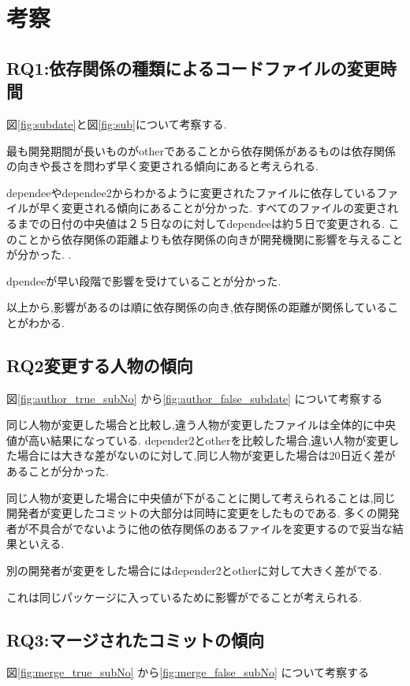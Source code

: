 \documentclass[submit,ses,noauthor]{ipsj} %
\begin{document}
\section{考察}\label{考察}

\subsection{RQ1:依存関係の種類によるコードファイルの変更時間}
図\ref{fig:subdate}と図\ref{fig:sub}について考察する.

最も開発期間が長いものがotherであることから依存関係があるものは依存関係の向きや長さを問わず早く変更される傾向にあると考えられる.


dependeeやdependee2からわかるように変更されたファイルに依存しているファイルが早く変更される傾向にあることが分かった.
すべてのファイルの変更されるまでの日付の中央値は２５日なのに対してdependeeは約５日で変更される.
このことから依存関係の距離よりも依存関係の向きが開発機関に影響を与えることが分かった.
.

dpendeeが早い段階で影響を受けていることが分かった.


以上から,影響があるのは順に依存関係の向き,依存関係の距離が関係していることがわかる.



\subsection{RQ2変更する人物の傾向}
図\ref{fig:author_true_subNo} から\ref{fig:author_false_subdate} について考察する

同じ人物が変更した場合と比較し,違う人物が変更したファイルは全体的に中央値が高い結果になっている.
depender2とotherを比較した場合,違い人物が変更した場合には大きな差がないのに対して,同じ人物が変更した場合は20日近く差があることが分かった.

同じ人物が変更した場合に中央値が下がることに関して考えられることは,同じ開発者が変更したコミットの大部分は同時に変更をしたものである.
多くの開発者が不具合がでないように他の依存関係のあるファイルを変更するので妥当な結果といえる.

別の開発者が変更をした場合にはdepender2とotherに対して大きく差がでる.

これは同じパッケージに入っているために影響がでることが考えられる.


\subsection{RQ3:マージされたコミットの傾向}
図\ref{fig:merge_true_subNo} から\ref{fig:merge_false_subNo} について考察する
\end{document}
